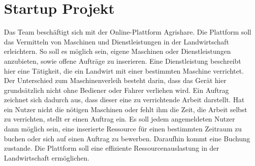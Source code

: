 \section{Startup Projekt}
\label{sec:Projektbeschreibung}
Das Team beschäftigt sich mit der Online-Plattform Agrishare. Die Plattform soll das Vermitteln von Maschinen und Dienstleistungen in der Landwirtschaft erleichtern. So soll es möglich sein, eigene Maschinen oder Dienstleistungen anzubieten, sowie offene Aufträge zu inserieren. Eine Dienstleistung beschreibt hier eine Tätigkeit, die ein Landwirt mit einer bestimmten Maschine verrichtet. Der Unterschied zum Maschinenverleih besteht darin, dass das Gerät hier grundsätzlich nicht ohne Bediener oder Fahrer verliehen wird. Ein Auftrag zeichnet sich dadurch aus, dass dieser eine zu verrichtende Arbeit darstellt. Hat ein Nutzer nicht die nötigen Maschinen oder fehlt ihm die Zeit, die Arbeit selbst zu verrichten, stellt er einen Auftrag ein. Es soll jedem angemeldeten Nutzer dann möglich sein, eine inserierte Ressource für einen bestimmten Zeitraum zu buchen oder sich auf einen Auftrag zu bewerben. Daraufhin kommt eine Buchung zustande. Die Plattform soll eine effiziente Ressourcenauslastung in der Landwirtschaft ermöglichen.